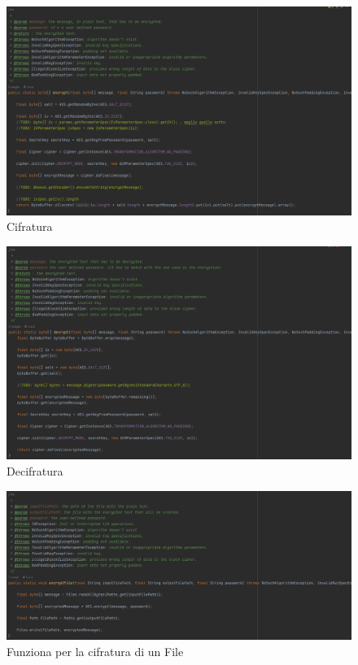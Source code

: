 \textsf{\small } %

\begin{figure}[H]
	\centering
	\includegraphics[width=1\textwidth, height=1\textheight, keepaspectratio]{./images/code/java/encrypt.PNG}
	\caption{Cifratura}
	\label{fig:encrypt_java}
\end{figure}

\textsf{\small } %

\begin{figure}[H]
	\centering
	\includegraphics[width=1\textwidth, height=1\textheight, keepaspectratio]{./images/code/java/decrypt.PNG}
	\caption{Decifratura}
	\label{fig:decrypt_java}
\end{figure}

\textsf{\small } %

\begin{figure}[H]
	\centering
	\includegraphics[width=1\textwidth, height=1\textheight, keepaspectratio]{./images/code/java/encryptFile.PNG}
	\caption{Funziona per la cifratura di un File}
	\label{fig:encryptFile}
\end{figure}

